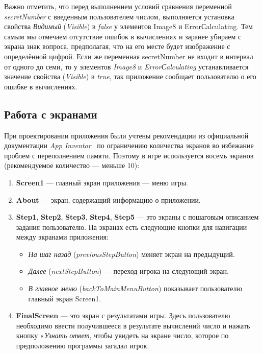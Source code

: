 Важно отметить, что перед выполнением условий сравнения переменной \textit{secretNumber} с введенным пользователем числом, выполняется установка свойства \textit{Видимый} (\textit{Visible}) в \textit{false} у элементов Image8 и ErrorСalculating.
Тем самым мы отмечаем отсутствие ошибок в вычислениях и заранее убираем с экрана знак вопроса, предполагая, что на его месте будет изображение с определённой цифрой. Если же переменная secretNumber не входит в интервал от одного до семи, то у элементов \textit{Image8} и \textit{ErrorСalculating} устанавливается значение свойства (\textit{Visible}) в \textit{true}, 
так приложение сообщает пользователю о его ошибке в вычислениях.

\subsection{Работа с экранами}
При проектировании приложения были учтены рекомендации из официальной документации \textit{App Inventor}~\cite{MitManyScreens} по ограничению количества экранов во избежание проблем с переполнением памяти.
Поэтому в игре используется восемь экранов (рекомендуемое количество — меньше 10):
\begin{enumerate}
\item \textbf{Screen1} — главный экран приложения — меню игры.
\item \textbf{About} — экран, содержащий информацию о приложении.
\item \textbf{Step1}, \textbf{Step2}, \textbf{Step3}, \textbf{Step4}, \textbf{Step5} — это экраны с пошаговым описанием задания пользователю. На экранах есть следующие кнопки для навигации между экранами приложения:
\begin{itemize}
  \item \textit{На шаг назад} (\textit{previousStepButton}) меняет экран на предыдущий.
  \item \textit{Далее} (\textit{nextStepButton}) — переход игрока на следующий экран.
  \item \textit{В главное меню} (\textit{backToMainMenuButton}) показывает пользователю главный экран Screen1.
\end{itemize}
\item \textbf{FinalScreen} — это экран с результатами игры. Здесь пользователю необходимо ввести получившееся в результате вычислений число и нажать кнопку «\textit{Узнать ответ}, чтобы увидеть на экране число, которое по предположению программы загадал игрок.
\end{enumerate}

